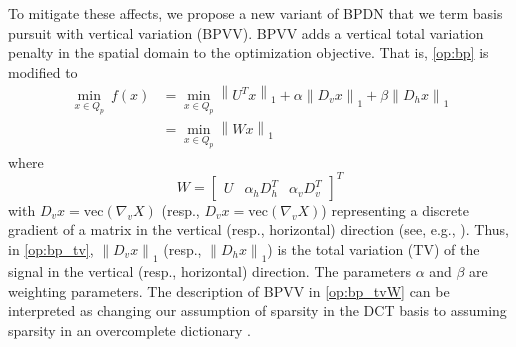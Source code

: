 \documentclass[twocolumn,oneside]{IEEEtran/IEEEtran}
\begin{document}
To mitigate these affects, we propose a new variant of BPDN that we term basis pursuit with
vertical variation (BPVV). BPVV adds a vertical total variation penalty in the spatial domain to the
optimization objective. That is, \eqref{op:bp} is modified to
\begin{align}
  \min_{x\in Q_p}~f(x) &= \min_{x\in Q_p} \left\|U^Tx\right\|_1
                         + \alpha\left\|D_vx\right\|_1
                         + \beta\left\|D_hx\right\|_1 \label{op:bp_tv}\\
                       &=\min_{x\in Q_p} \left\|Wx\right\|_1 \label{op:bp_tvW}
\end{align}
where
\begin{equation*}
W = \begin{bmatrix}U&\alpha_hD^T_h&\alpha_vD^T_v \end{bmatrix}^T
\end{equation*}
with ${D_v x=\text{vec}(\nabla_v X)}$ (resp., ${D_v x=\text{vec}(\nabla_v X)}$) representing a 
discrete gradient of a matrix in the vertical (resp., horizontal) direction (see, e.g., \cite[Section 6.1,]{becker_nesta_2011}). 
Thus, in \eqref{op:bp_tv}, $\left \| D_v x \right \|_1$ (resp., $\left \| D_h x \right \|_1$) is the total variation (TV) of the signal in the vertical (resp., horizontal) direction.
The parameters $\alpha$ and $\beta$ are weighting parameters.
The description of BPVV in \eqref{op:bp_tvW} can be interpreted as changing our assumption of sparsity in the DCT basis to assuming sparsity in an overcomplete dictionary \cite{candes_redundant_2011}.
\end{document}
